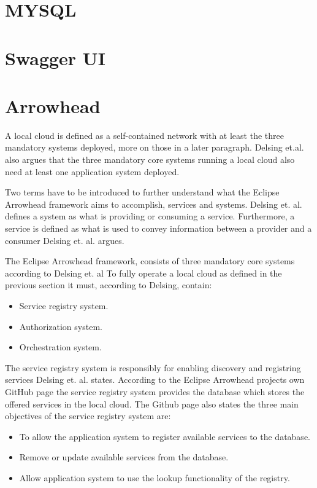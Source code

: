 \section{MYSQL}
\section{Swagger UI}
\section{Arrowhead}
A local cloud is defined as a self-contained network with at least the three mandatory systems deployed, more on those in a later paragraph. 
Delsing et.al. also argues that the three mandatory core systems running a local cloud also need at least one application system deployed.\cite{Delsing2017}

Two terms have to be introduced to further understand what the Eclipse Arrowhead framework aims to accomplish, services and systems.
Delsing et. al. defines a system as what is providing or consuming a service. 
Furthermore, a service is defined as what is used to convey information between a provider and a consumer Delsing et. al. argues.\cite{Delsing2017}

The Eclipse Arrowhead framework, consists of three mandatory core systems according to Delsing et. al
To fully operate a local cloud as defined in the previous section it must, according to Delsing, contain:
\begin{itemize}
    \item Service registry system.
    \item Authorization system. 
    \item Orchestration system.\cite{Delsing2017}
\end{itemize} 

The service registry system is responsibly for enabling discovery and registring services Delsing et. al. states. 
According to the Eclipse Arrowhead projects own GitHub page the service registry system provides the database which stores the offered services in the local cloud.\cite{Github2021}
The Github page also states the three main objectives of the service registry system are:
\begin{itemize}
    \item To allow the application system to register available services to the database. 
    \item Remove or update available services from the database.
    \item Allow application system to use the lookup functionality of the registry.
\end{itemize}

